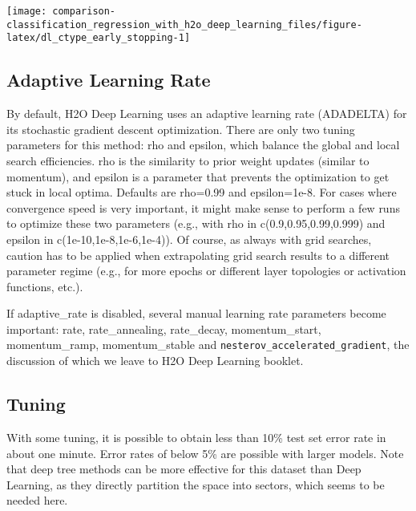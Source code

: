 \documentclass[]{book}
\begin{document}
\begin{center}\texttt{[image: comparison-classification\_regression\_with\_h2o\_deep\_learning\_files/figure-latex/dl\_ctype\_early\_stopping-1]} \end{center}

\hypertarget{adaptive-learning-rate}{%
\subsection{Adaptive Learning Rate}\label{adaptive-learning-rate}}

By default, H2O Deep Learning uses an adaptive learning rate (ADADELTA) for its stochastic gradient descent optimization. There are only two tuning parameters for this method: rho and epsilon, which balance the global and local search efficiencies. rho is the similarity to prior weight updates (similar to momentum), and epsilon is a parameter that prevents the optimization to get stuck in local optima. Defaults are rho=0.99 and epsilon=1e-8. For cases where convergence speed is very important, it might make sense to perform a few runs to optimize these two parameters (e.g., with rho in c(0.9,0.95,0.99,0.999) and epsilon in c(1e-10,1e-8,1e-6,1e-4)). Of course, as always with grid searches, caution has to be applied when extrapolating grid search results to a different parameter regime (e.g., for more epochs or different layer topologies or activation functions, etc.).

If adaptive\_rate is disabled, several manual learning rate parameters become important: rate, rate\_annealing, rate\_decay, momentum\_start, momentum\_ramp, momentum\_stable and \texttt{nesterov\_accelerated\_gradient}, the discussion of which we leave to H2O Deep Learning booklet.

\hypertarget{tuning}{%
\subsection{Tuning}\label{tuning}}

With some tuning, it is possible to obtain less than 10\% test set error rate in about one minute. Error rates of below 5\% are possible with larger models. Note that deep tree methods can be more effective for this dataset than Deep Learning, as they directly partition the space into sectors, which seems to be needed here.
\end{document}
